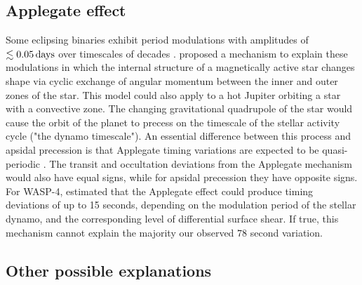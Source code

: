 \documentclass[12pt,twocolumn,tighten]{aastex62}
\begin{document}
\subsection{Applegate effect}
Some eclipsing binaries exhibit period modulations with amplitudes of
$\lesssim 0.05\,{\rm days}$ over timescales of decades \citep[{\it
e.g.},][]{soderhjelm_geometry_1980,hall_relation_1989}.
\citet{applegate_mechanism_1992} proposed a mechanism to explain these
modulations in which the internal structure of a magnetically active
star changes shape via cyclic exchange of angular momentum between the
inner and outer zones of the star.  This model could also apply to a
hot Jupiter orbiting a star with a convective zone.  The changing
gravitational quadrupole of the star would cause the orbit of the
planet to precess on the timescale of the stellar activity cycle ("the
dynamo timescale").  An essential difference between this process and
apsidal precession is that Applegate timing variations are expected to
be quasi-periodic \citep[{\it
e.g.},][Figure~12]{soderhjelm_geometry_1980}.  The transit and
occultation deviations from the Applegate mechanism would also have
equal signs, while for apsidal precession they have opposite signs.
For WASP-4, \citet{watson_orbital_2010} estimated that the Applegate
effect could produce timing deviations of up to 15 seconds, depending
on the modulation period of the stellar dynamo, and the corresponding
level of differential surface shear.  If true, this mechanism cannot
explain the majority our observed $78$ second variation.


\subsection{Other possible explanations}
\end{document}
